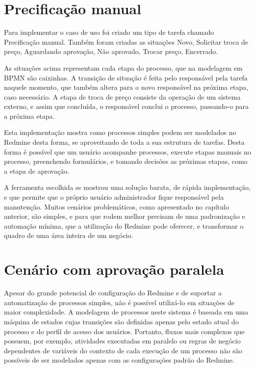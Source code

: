 \section{Precificação manual}\label{sec:redmine-impl-caso-uso}

Para implementar o caso de uso foi criado um tipo de tarefa chamado Precificação manual. Também foram criadas as situações Novo, Solicitar troca de preço, Aguardando aprovação, Não aprovado, Trocar preço, Encerrado.

As situações acima representam cada etapa do processo, que na modelagem em BPMN são caixinhas. A transição de situação é feita pelo responsável pela tarefa naquele momento, que também altera para o novo responsável na próxima etapa, caso necessário. A etapa de troca de preço consiste da operação de um sistema externo, e assim que concluída, o responsável conclui o processo, passando-o para a próxima etapa.

Esta implementação mostra como processos simples podem ser modelados no Redmine desta forma, se aproveitando de toda a sua estrutura de tarefas. Desta forma é possível que um usuário acompanhe processos, execute etapas manuais no processo, preenchendo formulários, e tomando decisões as próximas etapas, como a etapa de aprovação.

A ferramenta escolhida se mostrou uma solução barata, de rápida implementação, e que permite que o próprio usuário administrador fique responsável pela manutenção. Muitos cenários problemáticos, como apresentado no capítulo anterior, são simples, e para que rodem melhor precisam de uma padronização e automação mínima, que a utilização do Redmine pode oferecer, e transformar o quadro de uma área inteira de um negócio.

\section{Cenário com aprovação paralela}\label{sec:cenario-complexo}

Apesar do grande potencial de configuração do Redmine e de suportar a automatização de processos simples, não é possível utilizá-lo em situações de maior complexidade. A modelagem de processos neste sistema é baseada em uma máquina de estados cujas transições são definidas apenas pelo estado atual do processo e do perfil de acesso dos usuários. Portanto, fluxos mais complexos que possuem, por exemplo, atividades executadas em paralelo ou regras de negócio dependentes de variáveis do contexto de cada execução de um processo não são possíveis de ser modelados apenas com as configurações padrão do Redmine.

